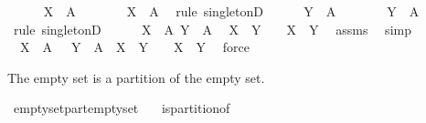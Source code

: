 \begin{isabellebody}
\ \ \ \ \isamarkupfalse%
\ {\isachardoublequoteopen}X\ {\isasymin}\ {\isacharbraceleft}A{\isacharbraceright}{\isachardoublequoteclose}\isanewline
\ \ \ \ \isamarkupfalse%
\ \isamarkupfalse%
\ {\isachardoublequoteopen}X\ {\isacharequal}\ A{\isachardoublequoteclose}\ \isamarkupfalse%
\ {\isacharparenleft}rule\ singletonD{\isacharparenright}\isanewline
\ \ \ \ \isamarkupfalse%
\ {\isachardoublequoteopen}Y\ {\isasymin}\ {\isacharbraceleft}A{\isacharbraceright}{\isachardoublequoteclose}\isanewline
\ \ \ \ \isamarkupfalse%
\ \isamarkupfalse%
\ {\isachardoublequoteopen}Y\ {\isacharequal}\ A{\isachardoublequoteclose}\ \isamarkupfalse%
\ {\isacharparenleft}rule\ singletonD{\isacharparenright}\isanewline
\ \ \ \ \isamarkupfalse%
\ {\isacharbackquoteopen}X\ {\isacharequal}\ A{\isacharbackquoteclose}\ {\isacharbackquoteopen}Y\ {\isacharequal}\ A{\isacharbackquoteclose}\ \isamarkupfalse%
\ {\isachardoublequoteopen}X\ {\isasyminter}\ Y\ {\isasymnoteq}\ {\isacharbraceleft}{\isacharbraceright}\ {\isasymlongleftrightarrow}\ X\ {\isacharequal}\ Y{\isachardoublequoteclose}\ \isamarkupfalse%
\ assms\ \isamarkupfalse%
\ simp\isanewline
\ \ \isacommand{{\isacharbraceright}}\isamarkupfalse%
\isanewline
\ \ \isamarkupfalse%
\ \isamarkupfalse%
\ {\isachardoublequoteopen}{\isasymforall}\ X\ {\isasymin}\ {\isacharbraceleft}A{\isacharbraceright}\ {\isachardot}\ {\isasymforall}\ Y\ {\isasymin}\ {\isacharbraceleft}A{\isacharbraceright}\ {\isachardot}\ X\ {\isasyminter}\ Y\ {\isasymnoteq}\ {\isacharbraceleft}{\isacharbraceright}\ {\isasymlongleftrightarrow}\ X\ {\isacharequal}\ Y{\isachardoublequoteclose}\ \isamarkupfalse%
\ force\isanewline
{}\isamarkupfalse%
%
\endisatagproof
{\isafoldproof}%
%
\isadelimproof
%
\endisadelimproof
%
\begin{isamarkuptext}%
The empty set is a partition of the empty set.%
\end{isamarkuptext}%
\isamarkuptrue%
\isamarkupfalse%
\ emptyset{\isacharunderscore}part{\isacharunderscore}emptyset{}{\isacharcolon}\isanewline
\ \ \ {\isachardoublequoteopen}is{\isacharunderscore}partition{\isacharunderscore}of\ {\isacharbraceleft}{\isacharbraceright}\ {\isacharbraceleft}{\isacharbraceright}{\isachardoublequoteclose}\ \isanewline
%
\isadelimproof
\ \ %
\endisadelimproof
%
\isatagproof

\end{isabellebody}
